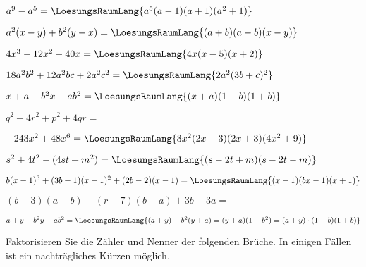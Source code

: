 \begin{bbwAufgabenBlock}
\item $a^9-a^5 = \LoesungsRaumLang{a^5(a-1)(a+1)(a^2+1)}$
\item $a^2(x-y) + b^2(y-x) =\LoesungsRaumLang{(a+b)(a-b)(x-y)}$
\item $4x^3-12x^2-40x = \LoesungsRaumLang{4x(x-5)(x+2)}$
\item $18a^2b^2+12a^2bc + 2a^2c^2 = \LoesungsRaumLang{2a^2(3b+c)^2}$\noTRAINER{\newpage}
\item $x+a-b^2x-ab^2 = \LoesungsRaumLang{(x+a)(1-b)(1+b)}$
\item $q^2-4r^2+p^2 + 4qr = $
\item $-243x^2 + 48x^6 = \LoesungsRaumLang{3x^2(2x-3)(2x+3)(4x^2+9)}$
\item $s^2+4t^2-(4st+m^2) = \LoesungsRaumLang{(s-2t+m)(s-2t-m)}$\noTRAINER{\newpage}
\item $b(x-1)^3 + (3b-1)(x-1)^2 + (2b-2)(x-1) = \LoesungsRaumLang{(x-1)(bx-1)(x+1)}$
\item $(b-3)(a-b)-(r-7)(b-a)+3b-3a =$\\
\item $a+y-b^2y-ab^2 = \LoesungsRaumLang{(a+y)-b^2(y+a) = (y+a)(1-b^2) = (a+y)\cdot{}(1-b)(1+b)}$
\end{bbwAufgabenBlock}
\newpage


Faktorisieren Sie die Zähler und Nenner der folgenden Brüche.
In einigen Fällen ist ein nachträgliches Kürzen möglich.


